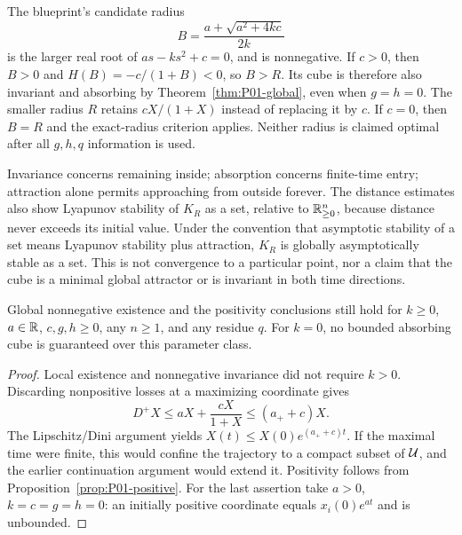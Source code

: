 \begin{remark}
The blueprint's candidate radius
\[
 B=\frac{a+\sqrt{a^2+4kc}}{2k}
\]
is the larger real root of $as-ks^2+c=0$, and is nonnegative. If $c>0$, then $B>0$ and
$H(B)=-c/(1+B)<0$, so $B>R$. Its cube is therefore also invariant
and absorbing by Theorem~\ref{thm:P01-global}, even when $g=h=0$.
The smaller radius $R$ retains $cX/(1+X)$ instead of replacing it
by $c$. If $c=0$, then $B=R$ and the exact-radius criterion applies.
Neither radius is claimed optimal after all $g,h,q$ information is used.

Invariance concerns remaining inside; absorption concerns finite-time
entry; attraction alone permits approaching from outside forever.
The distance estimates also show Lyapunov stability of $K_R$ as a set,
relative to $\mathbb{R}_{\geq 0}^{n}$, because distance never exceeds its initial value.
Under the convention that asymptotic stability of a set means Lyapunov
stability plus attraction, $K_R$ is globally asymptotically stable as
a set. This is not convergence to a particular point, nor a claim that
the cube is a minimal global attractor or is invariant in both time
directions.
\end{remark}

\begin{proposition}[Global existence when $k=0$ is allowed]
\label{prop:P01-kzero}
Global nonnegative existence and the positivity conclusions still hold
for $k\ge0$, $a\in\mathbb{R}$, $c,g,h\ge0$, any $n\ge1$, and any residue $q$.
For $k=0$, no bounded absorbing cube is guaranteed over this parameter
class.
\end{proposition}
\begin{proof}
Local existence and nonnegative invariance did not require $k>0$.
Discarding nonpositive losses at a maximizing coordinate gives
\[
 D^+X\le aX+\frac{cX}{1+X}\le(a_++c)X.
\]
The Lipschitz/Dini argument yields $X(t)\le X(0)e^{(a_++c)t}$.
If the maximal time were finite, this would confine the trajectory
to a compact subset of $\mathcal{U}$, and the earlier continuation
argument would extend it. Positivity follows from
Proposition~\ref{prop:P01-positive}. For the last assertion take
$a>0$, $k=c=g=h=0$: an initially positive coordinate equals
$x_i(0)e^{at}$ and is unbounded.
\end{proof}
